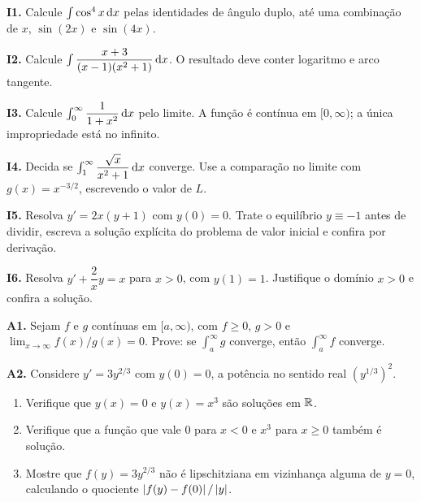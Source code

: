 \documentclass[11pt,a4paper]{article}
\begin{document}
\begin{exercicio}
\textbf{I1.} Calcule \(\int\cos^{4}x\,\mathrm{d} x\) pelas identidades de ângulo duplo, até uma combinação de \(x\), \(\sin(2x)\) e \(\sin(4x)\).
\end{exercicio}

\begin{exercicio}
\textbf{I2.} Calcule \(\int\dfrac{x+3}{(x-1)(x^{2}+1)}\,\mathrm{d} x\). O resultado deve conter logaritmo e arco tangente.
\end{exercicio}

\begin{exercicio}
\textbf{I3.} Calcule \(\int_0^{\infty}\dfrac{1}{1+x^{2}}\,\mathrm{d} x\) pelo limite. A função é contínua em \([0,\infty)\); a única impropriedade está no infinito.
\end{exercicio}

\begin{exercicio}
\textbf{I4.} Decida se \(\int_1^{\infty}\dfrac{\sqrt{x}}{x^{2}+1}\,\mathrm{d} x\) converge. Use a comparação no limite com \(g(x)=x^{-3/2}\), escrevendo o valor de \(L\).
\end{exercicio}

\begin{exercicio}
\textbf{I5.} Resolva \(y'=2x(y+1)\) com \(y(0)=0\). Trate o equilíbrio \(y\equiv -1\) antes de dividir, escreva a solução explícita do problema de valor inicial e confira por derivação.
\end{exercicio}

\begin{exercicio}
\textbf{I6.} Resolva \(y'+\dfrac{2}{x}y=x\) para \(x>0\), com \(y(1)=1\). Justifique o domínio \(x>0\) e confira a solução.
\end{exercicio}

\begin{exercicio}[Avançado --- comparação com \(L=0\)]
\textbf{A1.} Sejam \(f\) e \(g\) contínuas em \([a,\infty)\), com \(f\ge 0\), \(g>0\) e \(\lim_{x\to\infty} f(x)/g(x)=0\). Prove: se \(\int_a^{\infty} g\) converge, então \(\int_a^{\infty} f\) converge.
\end{exercicio}

\begin{exercicio}
\textbf{A2.} Considere \(y'=3y^{2/3}\) com \(y(0)=0\), a potência no sentido real \((y^{1/3})^{2}\).
\begin{enumerate}
\item Verifique que \(y(x)=0\) e \(y(x)=x^{3}\) são soluções em \(\mathbb{R}\).
\item Verifique que a função que vale \(0\) para \(x<0\) e \(x^{3}\) para \(x\ge 0\) também é solução.
\item Mostre que \(f(y)=3y^{2/3}\) não é lipschitziana em vizinhança alguma de \(y=0\), calculando o quociente \(\left\lvert f(y)-f(0) \right\rvert/\left\lvert y \right\rvert\).
\end{enumerate}
\end{exercicio}
\end{document}
